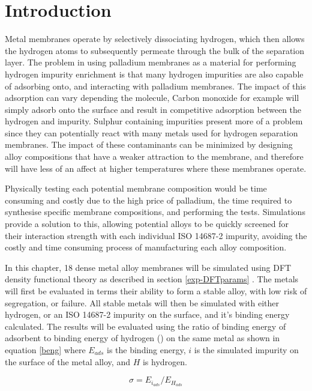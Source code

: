 \section{Introduction}
Metal membranes operate by selectively dissociating hydrogen, which then allows the hydrogen atoms to subsequently permeate through the bulk of the separation layer. The problem in using palladium membranes as a material for performing hydrogen impurity enrichment is that many hydrogen impurities are also capable of adsorbing onto, and interacting with palladium membranes. The impact of this adsorption can vary depending the molecule, Carbon monoxide for example will simply adsorb onto the surface and result in competitive adsorption between the hydrogen and impurity. Sulphur containing impurities present more of a problem since they can potentially react with many metals used for hydrogen separation membranes. The impact of these contaminants can be minimized by designing alloy compositions that have a weaker attraction to the membrane, and therefore will have less of an affect at higher temperatures where these membranes operate.

Physically testing each potential membrane composition would be time consuming and costly due to the high price of palladium, the time required to synthesise specific membrane compositions, and performing the tests. Simulations provide a solution to this, allowing potential alloys to be quickly screened for their interaction strength with each individual ISO 14687-2 impurity, avoiding the costly and time consuming process of manufacturing each alloy composition. 

In this chapter, 18 dense metal alloy membranes will be simulated using DFT density functional theory as described in section \ref{exp-DFTparams} \cite{QE-2009, QE-2017, doi:10.1063/5.0005082}. The metals will first be evaluated in terms their ability to form a stable alloy, with low risk of segregation, or failure. All stable metals will then be simulated with either hydrogen, or an ISO 14687-2 impurity on the surface, and it's binding energy calculated. The results will be evaluated using the ratio of binding energy of adsorbent to binding energy of hydrogen (\textsigma) on the same metal as shown in equation \ref{beng} where $E_{ads}$ is the binding energy, $i$ is the simulated impurity on the surface of the metal alloy, and $H$ is hydrogen. 

\begin{equation}\label{beng}
  \sigma=E_{i_{ads}}/E_{H_{ads}}
\end{equation}

